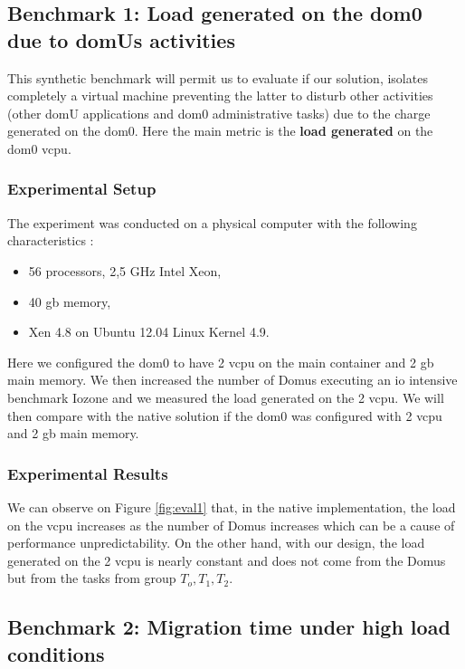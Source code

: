 \subsection{Benchmark 1: Load generated on the dom0 due to domUs activities}

This synthetic benchmark will permit us to evaluate if our solution, isolates completely a virtual machine preventing the latter to disturb other activities (other domU applications and dom0 administrative tasks) due to the charge generated on the dom0. Here the main metric is the \textbf{load generated} on the dom0 \acrshort{vcpu}.

\subsubsection{Experimental Setup}

The experiment was conducted on a physical computer with the following characteristics : 

\begin{itemize}
    \item 56 processors, 2,5 GHz Intel Xeon,
    \item 40 \acrshort{gb} memory,
    \item Xen 4.8 on Ubuntu 12.04 Linux Kernel 4.9.
\end{itemize}

Here we configured the dom0 to have 2 \acrshort{vcpu} on the main container and 2 \acrshort{gb} main memory. We then increased the number of Domus executing an \acrshort{io} intensive benchmark Iozone and we measured the load generated on the 2 \acrshort{vcpu}. We will then compare with the native solution if the dom0 was configured with 2 \acrshort{vcpu} and 2 \acrshort{gb} main memory.

\subsubsection{Experimental Results}

We can observe on Figure \ref{fig:eval1} that, in the native implementation, the load on the \acrshort{vcpu} increases as the number of Domus increases which can be a cause of performance unpredictability. On the other hand, with our design, the load generated on the 2 \acrshort{vcpu} is nearly constant and does not come from the Domus but from the tasks from group $T_o, T_1 , T_2$.

\subsection{Benchmark 2: Migration time under high load conditions}

